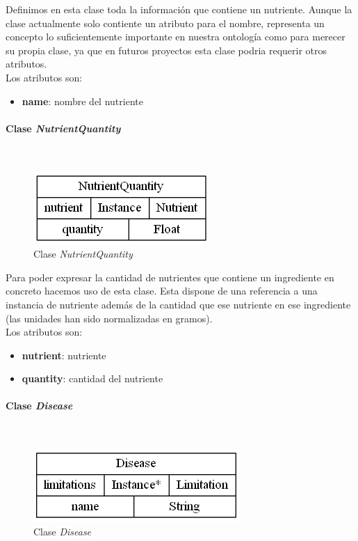 \documentclass[11]{article}
\begin{document}
Definimos en esta clase toda la información que contiene un nutriente.
Aunque la clase actualmente solo contiente un atributo para el nombre, representa un concepto lo suficientemente importante en nuestra ontología como para merecer su propia clase, ya que en futuros proyectos esta clase podria requerir otros atributos.
\\

Los atributos son:
\begin{itemize} 
\item \textbf{name}: nombre del nutriente
\end{itemize}

\vspace{0.5cm}

\paragraph{Clase \emph{NutrientQuantity}}\mbox{}\\
\begin{figure}[H]
\centering
\includegraphics[scale=0.5]{images/class_NutrientQuantity.png}
\caption{Clase \emph{NutrientQuantity}}
\label{fig_class_NutrientQuantity}
\end{figure}

Para poder expresar la cantidad de nutrientes que contiene un ingrediente en concreto hacemos uso de esta clase. Esta dispone de una referencia a una instancia de nutriente además de la cantidad que ese nutriente en ese ingrediente (las unidades han sido normalizadas en gramos). 
\\

Los atributos son: 
\begin{itemize}
\item \textbf{nutrient}: nutriente
\item \textbf{quantity}: cantidad del nutriente
\end{itemize}


\vspace{0.5cm}

\paragraph{Clase \emph{Disease}}\mbox{}\\
\begin{figure}[H]
\centering
\includegraphics[scale=0.5]{images/class_Disease.png}
\caption{Clase \emph{Disease}}
\label{fig_class_Disease}
\end{figure}
\end{document}
